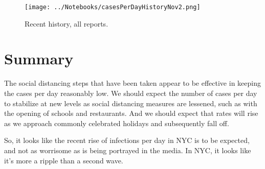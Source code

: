 \documentclass[10pt,reqno]{amsart}
\begin{document}
\begin{figure}[h!btp]
  \centering
  \texttt{[image: ../Notebooks/casesPerDayHistoryNov2.png]}
  \caption{Recent history, all reports.}
  \label{fig:growthNov2}
\end{figure}

\section{Summary}
The social distancing steps that have been taken appear to be
effective in keeping the cases per day reasonably low.  We should
expect the number of cases per day to stabilize at new levels as
social distancing measures are lessened, such as with the opening of
schools and restaurants.  And we should expect that rates will rise
as we approach commonly celebrated holidays and subsequently fall off.

So, it looks like the recent rise of infections per day in NYC
is to be expected, and not as worrisome as is being portrayed in the
media.  In NYC, it looks like it's more a ripple than a second wave.

\printbibliography
\end{document}
